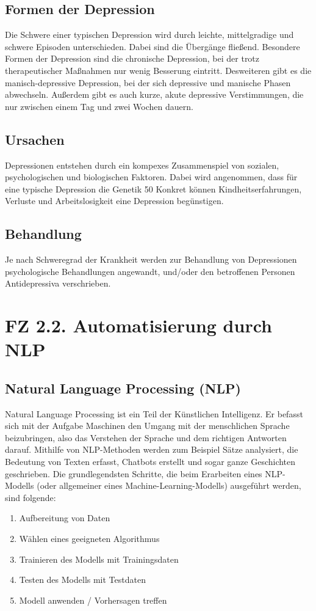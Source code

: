 \subsection{Formen der Depression}
Die Schwere einer typischen Depression wird durch leichte, mittelgradige und schwere Episoden unterschieden. Dabei 
sind die Übergänge fließend.
Besondere Formen der Depression sind die chronische Depression, bei der trotz therapeutischer Maßnahmen nur wenig 
Besserung eintritt. Desweiteren gibt es die manisch-depressive Depression, bei der sich depressive und manische 
Phasen abwechseln. Außerdem gibt es auch kurze, akute depressive Verstimmungen, die nur zwischen einem Tag und
zwei Wochen dauern. 

\subsection{Ursachen}
Depressionen entstehen durch ein kompexes Zusammenspiel von sozialen, psychologischen und biologischen Faktoren.
Dabei wird angenommen, dass für eine typische Depression die Genetik 50%
Konkret können Kindheitserfahrungen, Verluste und Arbeitslosigkeit eine Depression begünstigen.

\subsection{Behandlung}
Je nach Schweregrad der Krankheit werden zur Behandlung von Depressionen psychologische Behandlungen angewandt, 
und/oder den betroffenen Personen Antidepressiva verschrieben.


%
%
\section{FZ 2.2. Automatisierung durch NLP}
\label{sec:fz2.2.} 

\subsection{Natural Language Processing (NLP)}
Natural Language Processing ist ein Teil der Künstlichen Intelligenz. Er befasst sich mit der Aufgabe
Maschinen den Umgang mit der menschlichen Sprache beizubringen, also das Verstehen der Sprache und dem
richtigen Antworten darauf. Mithilfe von NLP-Methoden werden zum Beispiel Sätze analysiert, die Bedeutung 
von Texten erfasst, Chatbots erstellt und sogar ganze Geschichten geschrieben.
Die grundlegendsten Schritte, die beim Erarbeiten eines NLP-Modells (oder allgemeiner eines 
Machine-Learning-Modells) ausgeführt werden, sind folgende:
\begin{enumerate}
	\item Aufbereitung von Daten
	\item Wählen eines geeigneten Algorithmus
	\item Trainieren des Modells mit Trainingsdaten
	\item Testen des Modells mit Testdaten
	\item Modell anwenden / Vorhersagen treffen
\end{enumerate}

